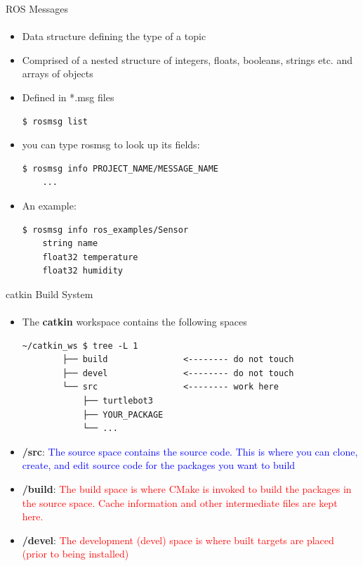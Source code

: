 \documentclass[aspectratio=169]{beamer}
\begin{document}
\begin{frame}[fragile]{ROS Messages}
	\framesubtitle{ }
	\begin{minipage}{0.6\textwidth}
    \begin{itemize}
        \item Data structure defining the type of a topic
		\item Comprised of a nested structure of integers, floats, booleans, strings etc. and arrays of objects
		\item Defined in *.msg files
		\begin{lstlisting}[language=bash]
	$ rosmsg list
		\end{lstlisting}
		\item you can type rosmsg to look up its fields:
		\begin{lstlisting}[language=bash]
	$ rosmsg info PROJECT_NAME/MESSAGE_NAME
	...
		\end{lstlisting}

		\item An example:
		\begin{lstlisting}[language=bash]
	$ rosmsg info ros_examples/Sensor 
	string name
	float32 temperature
	float32 humidity	
		\end{lstlisting}

    \end{itemize}

\end{minipage}
\begin{minipage}{0.4\textwidth}
	
\end{minipage}
\end{frame}


\begin{frame}[fragile]{catkin Build System}
	\framesubtitle{ }
    \begin{itemize}
        \item The \textbf{catkin} workspace contains the following spaces

		\begin{lstlisting}[style=ascii-tree]
		~/catkin_ws $ tree -L 1
		├── build				<-------- do not touch
		├── devel				<-------- do not touch
		└── src					<-------- work here
			├── turtlebot3
			├── YOUR_PACKAGE
			└── ...
		\end{lstlisting}

		\item \textbf{/src}: \textcolor{blue}{The source space contains the source code. This is where you can clone, create, and edit source code for the packages you want to build}
		\item \textbf{/build}: \textcolor{red}{The build space is where CMake is invoked to build the packages in the source space. Cache information and other intermediate files are kept here.}
		\item \textbf{/devel}: \textcolor{red}{The development (devel) space is where built targets are placed (prior to being installed)}
		\end{itemize}
\end{frame}
\end{document}
